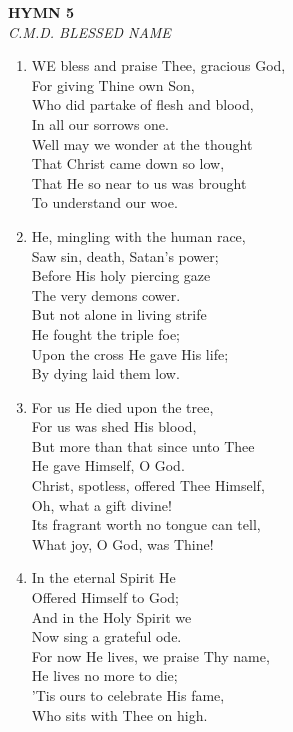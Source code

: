 \documentclass[11pt,a4paper]{article}
\begin{document}
\newpage
\begin{center}
    {\Large \textbf{HYMN 5}}
    \\
    \textit{C.M.D. BLESSED NAME}
\end{center}
\vspace{1em}

\begin{enumerate}
    \item WE bless and praise Thee, gracious God, \\
        For giving Thine own Son, \\
        Who did partake of flesh and blood, \\
        In all our sorrows one. \\
        Well may we wonder at the thought \\
        That Christ came down so low, \\
        That He so near to us was brought \\
        To understand our woe.

    \item He, mingling with the human race, \\
        Saw sin, death, Satan's power; \\
        Before His holy piercing gaze \\
        The very demons cower. \\
        But not alone in living strife \\
        He fought the triple foe; \\
        Upon the cross He gave His life; \\
        By dying laid them low.

    \item For us He died upon the tree, \\
        For us was shed His blood, \\
        But more than that since unto Thee \\
        He gave Himself, O God. \\
        Christ, spotless, offered Thee Himself, \\
        Oh, what a gift divine! \\
        Its fragrant worth no tongue can tell, \\
        What joy, O God, was Thine!

    \item In the eternal Spirit He \\
        Offered Himself to God; \\
        And in the Holy Spirit we \\
        Now sing a grateful ode. \\
        For now He lives, we praise Thy name, \\
        He lives no more to die; \\
        'Tis ours to celebrate His fame, \\
        Who sits with Thee on high.


\end{enumerate}
\end{document}
